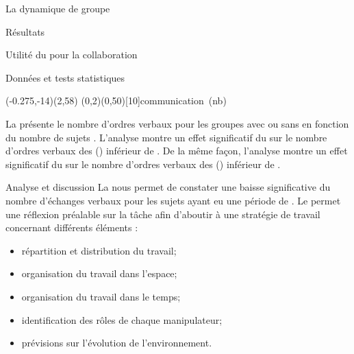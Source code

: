 \documentclass[myfrancais,ngerman,english,french]{mythesis}
\begin{document}
\begin{mychapter}{La dynamique de groupe}
\begin{mysection}{Résultats}
\begin{mysubsection}{Utilité du \mybrainstorming pour la collaboration}
\begin{mysubsubsection}{Données et tests statistiques}
					\begin{myfigure}
						\begin{myps}(-0.275,-14)(2,58)
							\myaxes(0,2){\mybrainstorming}(0,50)[10]{communication~(nb)}
						\end{myps}
					\end{myfigure}

					La  présente le nombre d'ordres verbaux  pour les groupes avec ou sans \mybrainstorming {} en fonction du nombre de sujets .
					L'analyse montre un effet significatif du \mybrainstorming {} sur le nombre d'ordres verbaux  des  () inférieur de .
					De la même façon, l'analyse montre un effet significatif du \mybrainstorming {} sur le nombre d'ordres verbaux  des  () inférieur de .
				\end{mysubsubsection}
				\begin{mysubsubsection}{Analyse et discussion}
					La  nous permet de constater une baisse significative du nombre d'échanges verbaux pour les sujets ayant eu une période de \mybrainstorming.
					Le \mybrainstorming permet une réflexion préalable sur la tâche afin d'aboutir à une stratégie de travail concernant différents éléments :
					\begin{itemize}
						\item répartition et distribution du travail;
						\item organisation du travail dans l'espace;
						\item organisation du travail dans le temps;
						\item identification des rôles de chaque manipulateur;
						\item prévisions sur l'évolution de l'environnement.
					\end{itemize}


\end{mysubsubsection}
\end{mysubsection}
\end{mysection}
\end{mychapter}
\end{document}
